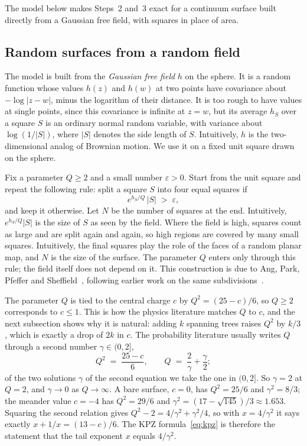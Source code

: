 The model below makes Steps~2 and~3 exact for a continuum surface built directly from a Gaussian
free field, with squares in place of area.

\subsection{Random surfaces from a random field}

The model is built from the \emph{Gaussian free field} $h$ on the sphere. It is a random
function whose values $h(z)$ and $h(w)$ at two points have covariance about $-\log|z-w|$, minus
the logarithm of their distance. It is too rough to have values at single points, since this
covariance is infinite at $z=w$, but its average $h_S$ over a square
$S$ is an ordinary normal random variable, with variance about $\log(1/|S|)$, where $|S|$ denotes
the side length of $S$. Intuitively, $h$ is the two-dimensional analog of Brownian motion. We use
it on a fixed unit square drawn on the sphere.

Fix a parameter $Q\ge2$ and a small number $\varepsilon>0$. Start from the unit square and repeat
the following rule: split a square $S$ into four equal squares if
\[ e^{h_S/Q}\,|S| \;>\; \varepsilon ,\]
and keep it otherwise. Let $N$ be the number of squares at the end. Intuitively,
$e^{h_S/Q}|S|$ is the size of $S$ as seen by the field. Where the field is high, squares count as
large and are split again and again, so high regions are covered by many small squares. Intuitively, the final squares play the role of the faces of a random planar map, and
$N$ is the size of the surface. The parameter $Q$ enters only through this rule; the field itself
does not depend on it. This construction is due to Ang, Park, Pfeffer and
Sheffield~\cite{APPS}, following earlier work on the same subdivisions~\cite{DS}.

The parameter $Q$ is tied to the central charge $c$ by $Q^2=(25-c)/6$, so $Q\ge2$ corresponds to
$c\le1$. This is how the physics literature matches $Q$ to $c$, and the next subsection shows why it
is natural: adding $k$ spanning trees raises $Q^2$ by $k/3$, which is exactly a drop of $2k$ in
$c$. The probability literature usually writes $Q$ through a second number $\gamma\in(0,2]$,
\begin{equation}\label{eq:Q}
Q^2 \;=\; \frac{25-c}{6}, \qquad Q \;=\; \frac{2}{\gamma}+\frac{\gamma}{2};
\end{equation}
of the two solutions $\gamma$ of the second equation we take the one in $(0,2]$. So $\gamma=2$ at
$Q=2$, and $\gamma\to0$ as $Q\to\infty$. A bare surface, $c=0$, has $Q^2=25/6$ and
$\gamma^2=8/3$; the meander value $c=-4$ has $Q^2=29/6$ and
$\gamma^2=(17-\sqrt{145})/3\approx1.653$. Squaring the second relation gives
$Q^2-2=4/\gamma^2+\gamma^2/4$, so with $x=4/\gamma^2$ it says exactly $x+1/x=(13-c)/6$. The KPZ
formula~\eqref{eq:kpz} is therefore the statement that the tail exponent $x$ equals $4/\gamma^2$.


